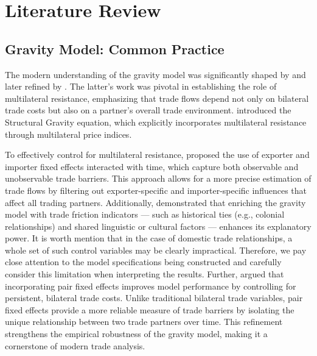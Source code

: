 \section{Literature Review}
\label{sec: litrev}

\subsection{Gravity Model: Common Practice}

The modern understanding of the gravity model was significantly shaped by \textcite{bergstrand1985gravity} and later refined by \textcite{anderson2003gravity}. The latter's work was pivotal in establishing the role of multilateral resistance, emphasizing that trade flows depend not only on bilateral trade costs but also on a partner’s overall trade environment. \textcite{anderson2003gravity} introduced the Structural Gravity equation, which explicitly incorporates multilateral resistance through multilateral price indices.

To effectively control for multilateral resistance, \textcite{anderson2003gravity} proposed the use of exporter and importer fixed effects interacted with time, which capture both observable and unobservable trade barriers. This approach allows for a more precise estimation of trade flows by filtering out exporter-specific and importer-specific influences that affect all trading partners. Additionally, \textcite{anderson2011gravity} demonstrated that enriching the gravity model with trade friction indicators — such as historical ties (e.g., colonial relationships) and shared linguistic or cultural factors — enhances its explanatory power. It is worth mention that in the case of domestic trade relationships, a whole set of such control variables may be clearly impractical. Therefore, we pay close attention to the model specifications being constructed and carefully consider this limitation when interpreting the results. Further, \textcite{yotov2016advanced} argued that incorporating pair fixed effects improves model performance by controlling for persistent, bilateral trade costs. Unlike traditional bilateral trade variables, pair fixed effects provide a more reliable measure of trade barriers by isolating the unique relationship between two trade partners over time. This refinement strengthens the empirical robustness of the gravity model, making it a cornerstone of modern trade analysis.

